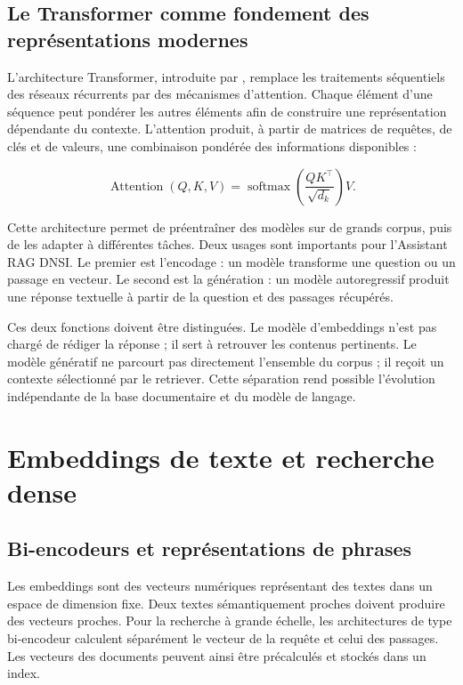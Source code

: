\subsection{Le Transformer comme fondement des représentations modernes}

L'architecture Transformer, introduite par \citet{Vaswani2017}, remplace les traitements séquentiels des réseaux récurrents par des mécanismes d'attention. Chaque élément d'une séquence peut pondérer les autres éléments afin de construire une représentation dépendante du contexte. L'attention produit, à partir de matrices de requêtes, de clés et de valeurs, une combinaison pondérée des informations disponibles :

\begin{equation}
\operatorname{Attention}(Q,K,V)=\operatorname{softmax}\left(\frac{QK^{\top}}{\sqrt{d_k}}\right)V.
\end{equation}

Cette architecture permet de préentraîner des modèles sur de grands corpus, puis de les adapter à différentes tâches. Deux usages sont importants pour l'Assistant RAG DNSI. Le premier est l'encodage : un modèle transforme une question ou un passage en vecteur. Le second est la génération : un modèle autoregressif produit une réponse textuelle à partir de la question et des passages récupérés.

Ces deux fonctions doivent être distinguées. Le modèle d'embeddings n'est pas chargé de rédiger la réponse ; il sert à retrouver les contenus pertinents. Le modèle génératif ne parcourt pas directement l'ensemble du corpus ; il reçoit un contexte sélectionné par le retriever. Cette séparation rend possible l'évolution indépendante de la base documentaire et du modèle de langage.

\section{Embeddings de texte et recherche dense}

\subsection{Bi-encodeurs et représentations de phrases}

Les embeddings sont des vecteurs numériques représentant des textes dans un espace de dimension fixe. Deux textes sémantiquement proches doivent produire des vecteurs proches. Pour la recherche à grande échelle, les architectures de type bi-encodeur calculent séparément le vecteur de la requête et celui des passages. Les vecteurs des documents peuvent ainsi être précalculés et stockés dans un index.

